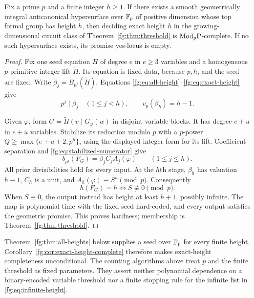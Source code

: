 \begin{theorem}\label{fg:thm:exact-seed}
Fix a prime $p$ and a finite integer $h\ge1$. If there exists a smooth
geometrically integral anticanonical hypersurface over $\mathbb F_p$ of
positive dimension whose top formal group has height $h$, then
deciding exact height $h$ in the growing-dimensional circuit class
of Theorem~\ref{fg:thm:threshold} is $\mathrm{Mod}_p\mathrm P$-complete. If no such
hypersurface exists, its promise yes-locus is empty.
\end{theorem}

\begin{proof}
Fix one seed equation $H$ of degree $e$ in $e\ge3$ variables and a
homogeneous $p$-primitive integer lift $\widetilde H$. Its equation is
fixed data, because $p,h$, and the seed are fixed. Write
$\beta_j=B_{p^j}(\widetilde H)$. Equations
\eqref{fg:eq:all-height}--\eqref{fg:eq:exact-height} give
\[
 p^j\mid\beta_j\quad(1\le j<h),\qquad
 v_p(\beta_h)=h-1.
\]

Given $\varphi$, form $G=\widetilde H(v)G_\varphi(w)$ in disjoint
variable blocks. It has degree $e+u$ in $e+u$ variables. Stabilize
its reduction modulo $p$ with a $p$-power
$Q\ge\max\{e+u+2,p^h\}$, using the displayed integer form for its
lift. Coefficient separation and
\eqref{fg:eq:stabilized-numerator} give
\[
 b_{p^j}(F_G)=\beta_jC_jA_j(\varphi)\qquad(1\le j\le h).
\]
All prior divisibilities hold for every input. At the $h$th stage,
$\beta_h$ has valuation $h-1$, $C_h$ is a unit, and
$A_h(\varphi)\equiv S^h\pmod p$. Consequently
\[
 h(F_G)=h\iff S\not\equiv0\pmod p.
\]
When $S\equiv0$, the output instead has height at least $h+1$,
possibly infinite. The map is polynomial time with the fixed seed
hard-coded, and every output satisfies the geometric promise.
This proves hardness; membership is
Theorem~\ref{fg:thm:threshold}.
\end{proof}

Theorem~\ref{fg:thm:all-heights} below supplies a seed over $\mathbb F_p$
for every finite height. Corollary~\ref{fg:cor:exact-height-complete}
therefore makes exact-height completeness unconditional.
The counting algorithms above treat $p$ and the finite threshold as
fixed parameters. They assert neither polynomial dependence on a
binary-encoded variable threshold nor a finite stopping rule for the
infinite list in \eqref{fg:eq:infinite-height}.
